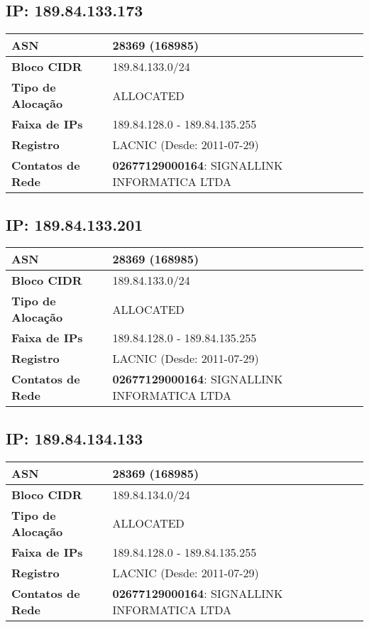     \subsection{IP: 189.84.133.173}
    \begin{tabular}{|l|l|}
    \hline
    \textbf{ASN} & 28369 (168985) \\ \hline
    \textbf{Bloco CIDR} & 189.84.133.0/24 \\ \hline
    \textbf{Tipo de Alocação} & ALLOCATED \\ \hline
    \textbf{Faixa de IPs} & 189.84.128.0 - 189.84.135.255 \\ \hline
    \textbf{Registro} & LACNIC (Desde: 2011-07-29) \\ \hline
        
\textbf{Contatos de Rede} & \textbf{02677129000164}: SIGNALLINK INFORMATICA LTDA 
\\ \hline
\end{tabular}


    \subsection{IP: 189.84.133.201}
    \begin{tabular}{|l|l|}
    \hline
    \textbf{ASN} & 28369 (168985) \\ \hline
    \textbf{Bloco CIDR} & 189.84.133.0/24 \\ \hline
    \textbf{Tipo de Alocação} & ALLOCATED \\ \hline
    \textbf{Faixa de IPs} & 189.84.128.0 - 189.84.135.255 \\ \hline
    \textbf{Registro} & LACNIC (Desde: 2011-07-29) \\ \hline
        
\textbf{Contatos de Rede} & \textbf{02677129000164}: SIGNALLINK INFORMATICA LTDA 
\\ \hline
\end{tabular}


    \subsection{IP: 189.84.134.133}
    \begin{tabular}{|l|l|}
    \hline
    \textbf{ASN} & 28369 (168985) \\ \hline
    \textbf{Bloco CIDR} & 189.84.134.0/24 \\ \hline
    \textbf{Tipo de Alocação} & ALLOCATED \\ \hline
    \textbf{Faixa de IPs} & 189.84.128.0 - 189.84.135.255 \\ \hline
    \textbf{Registro} & LACNIC (Desde: 2011-07-29) \\ \hline
        
\textbf{Contatos de Rede} & \textbf{02677129000164}: SIGNALLINK INFORMATICA LTDA 
\\ \hline
\end{tabular}


